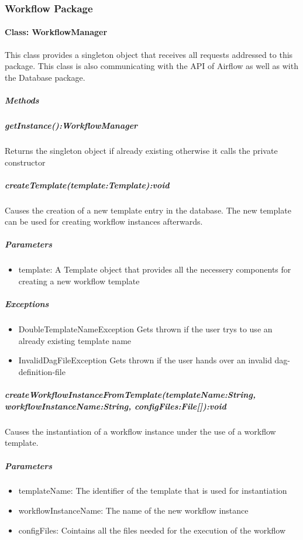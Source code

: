 \subsubsection{Workflow Package}


\paragraph{Class: WorkflowManager}
This class provides a singleton object that receives all requests addressed to this package. This class is also communicating with the API of Airflow as well as with the Database package.
\subparagraph{Methods}

\subparagraph{getInstance():WorkflowManager}
Returns the singleton object if already existing otherwise it calls the private constructor

\subparagraph{createTemplate(template:Template):void}
Causes the creation of a new template entry in the database. The new template can be used for creating workflow instances afterwards.

\subparagraph{Parameters}
\begin{itemize}
	\item{template:}
	A Template object that provides all the necessery components for creating a new workflow template
\end{itemize}

\subparagraph{Exceptions}
\begin{itemize}
	\item{DoubleTemplateNameException}
	Gets thrown if the user trys to use an already existing template name
	\item{InvalidDagFileException}
	Gets thrown if the user hands over an invalid dag-definition-file
\end{itemize}

\subparagraph{createWorkflowInstanceFromTemplate(templateName:String, workflowInstanceName:String, configFiles:File[]):void}
Causes the instantiation of a workflow instance under the use of a workflow template. 

\subparagraph{Parameters}
\begin{itemize}
	\item{templateName:}
	The identifier of the template that is used for instantiation
	\item{workflowInstanceName:}
	The name of the new workflow instance
	\item{configFiles:}
	Cointains all the files needed for the execution of the workflow
\end{itemize}

